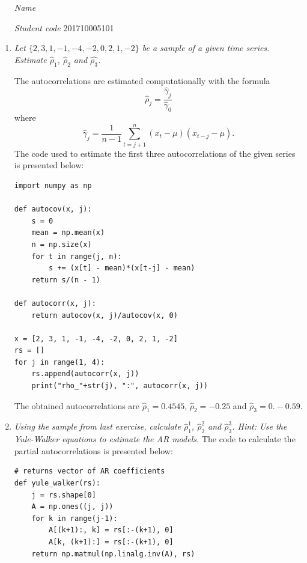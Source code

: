 \documentclass[fleqn]{article}
\begin{document}
 \vspace{0.3cm}
   \begin{itemize}[leftmargin=6.25cm, labelsep=0.5cm]

     \item[\textit{Name}]  %
     \item[\textit{Student code}] 201710005101 %

   \end{itemize}
\vspace{0.3cm}

\begin{enumerate}
\item \textit{Let $\{2,3,1,-1,-4,-2,0,2,1,-2\}$ be a sample of a given time series. Estimate $\hat{\rho}_1$, $\hat{\rho}_2$ and $\hat{\rho_3}$.}

The autocorrelations are estimated computationally with the formula
\begin{equation}
    \hat{\rho}_j=\dfrac{\hat{\gamma}_j}{\hat{\gamma}_0}
\end{equation}
where
\[
\hat{\gamma}_j=\dfrac{1}{n-1}\sum_{t=j+1}^n(x_t-\mu)(x_{t-j}-\mu).
\]
The code used to estimate the first three autocorrelations of the given series is presented below:

\begin{verbatim}
import numpy as np

def autocov(x, j):
    s = 0
    mean = np.mean(x)
    n = np.size(x)
    for t in range(j, n):
        s += (x[t] - mean)*(x[t-j] - mean)
    return s/(n - 1)
    
def autocorr(x, j):
    return autocov(x, j)/autocov(x, 0)
    
x = [2, 3, 1, -1, -4, -2, 0, 2, 1, -2]
rs = []
for j in range(1, 4):
    rs.append(autocorr(x, j))
    print("rho_"+str(j), ":", autocorr(x, j))
\end{verbatim}
The obtained autocorrelations are $\hat{\rho}_1=0.4545$, $\hat{\rho}_2=-0.25$ and $\hat{\rho}_3=0.-0.59$.

\item \textit{Using the sample from last exercise, calculate $\hat{\rho}_1^1$, $\hat{\rho}_2^2$ and $\hat{\rho}_3^3$. Hint: Use the Yule-Walker equations to estimate the AR models.}
The code to calculate the partial autocorrelations is presented below:
\begin{verbatim}
# returns vector of AR coefficients
def yule_walker(rs):
    j = rs.shape[0]
    A = np.ones((j, j))
    for k in range(j-1):
        A[(k+1):, k] = rs[:-(k+1), 0]
        A[k, (k+1):] = rs[:-(k+1), 0]
    return np.matmul(np.linalg.inv(A), rs)
    

\end{verbatim}
\end{enumerate}
\end{document}
